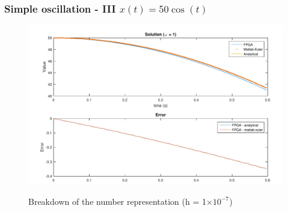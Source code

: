 \documentclass{beamer}[10]
\newcommand{\ve}[1]{\mathbf{\textcolor{blue}{#1}}}
\newcommand{\horspace}{\hspace{15pt}}
\providecommand{\e}[1]{\ensuremath{\times 10^{#1}}}
\begin{document}
\begin{frame}
	\frametitle{Simple oscillation - III \horspace{} $x(t) = 50 \cos(t)$}
	\begin{figure}
		\centering
		\includegraphics[width=\columnwidth]{figs/euler_o1_ts=0,0000001_os=1000}
		\label{f:euler_o1_ts=0,0000001_os=1000}
		\caption{Breakdown of the number representation (h = 1\e{-7})}
	\end{figure}
\end{frame}

\end{document}
